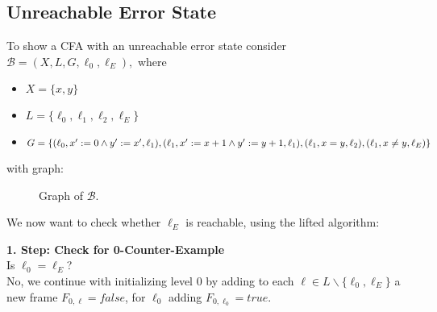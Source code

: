 \documentclass[11pt, a4paper, BCOR=10mm, ngerman]{scrbook}
\begin{document}
\pagebreak

\subsection{Unreachable Error State}
To show a CFA with an unreachable error state consider $\mathcal{B} = (X, L, G, \ell_0, \ell_E),$ where
\begin{itemize}
\item $X = \{x, y\}$
\item $L = \{\ell_0, \ell_1, \ell_2, \ell_E\}$
\item $G = \{(\ell_0, x' := 0 \land y' := x', \ell_1), (\ell_1, x' := x+1 \land y' := y+1, \ell_1),\\ (\ell_1, x = y, \ell_2), (\ell_1, x \neq y, \ell_E) \}$
\end{itemize}

with graph: \\


\begin{figure}[H]
\centering
\hspace*{3cm}
  \caption{Graph of $\mathcal{B}$.}
 \end{figure}
 \label{ex1} 

We now want to check whether $\ell_E$ is reachable, using the lifted algorithm: \par

\textbf{1. Step: Check for 0-Counter-Example} \\
Is $\ell_0 = \ell_E$? \\
No, we continue with initializing level 0 by adding to each $\ell \in L \backslash \{\ell_0, \ell_E\}$ a new frame $F_{0, \ell} = false$, for $\ell_0$ adding $F_{0, \ell_0} = true$. \\ \\
\end{document}
